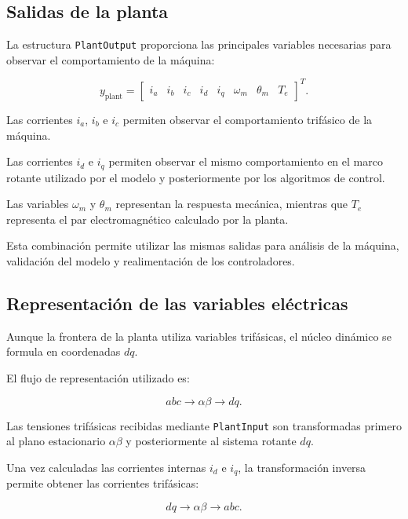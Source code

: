 \subsection{Salidas de la planta}

La estructura \texttt{PlantOutput} proporciona las principales variables necesarias para observar el comportamiento de la máquina:

\begin{equation}
y_{\mathrm{plant}}=
\begin{bmatrix}
i_a &
i_b &
i_c &
i_d &
i_q &
\omega_m &
\theta_m &
T_e
\end{bmatrix}^{T}.
\end{equation}

Las corrientes $i_a$, $i_b$ e $i_c$ permiten observar el comportamiento trifásico de la máquina.

Las corrientes $i_d$ e $i_q$ permiten observar el mismo comportamiento en el marco rotante utilizado por el modelo y posteriormente por los algoritmos de control.

Las variables $\omega_m$ y $\theta_m$ representan la respuesta mecánica, mientras que $T_e$ representa el par electromagnético calculado por la planta.

Esta combinación permite utilizar las mismas salidas para análisis de la máquina, validación del modelo y realimentación de los controladores.

\subsection{Representación de las variables eléctricas}

Aunque la frontera de la planta utiliza variables trifásicas, el núcleo dinámico se formula en coordenadas $dq$.

El flujo de representación utilizado es:

\begin{equation}
abc
\rightarrow
\alpha\beta
\rightarrow
dq.
\end{equation}

Las tensiones trifásicas recibidas mediante \texttt{PlantInput} son transformadas primero al plano estacionario $\alpha\beta$ y posteriormente al sistema rotante $dq$.

Una vez calculadas las corrientes internas $i_d$ e $i_q$, la transformación inversa permite obtener las corrientes trifásicas:

\begin{equation}
dq
\rightarrow
\alpha\beta
\rightarrow
abc.
\end{equation}

